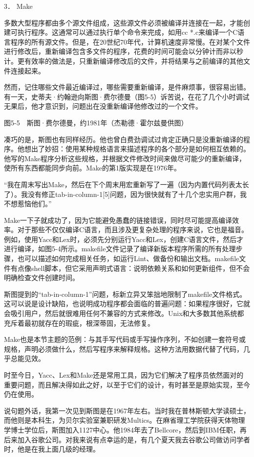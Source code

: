 \documentclass[a4paper,12pt,UTF8,twoside]{ctexbook}
\begin{document}
{{3． Make


多数大型程序都由多个源文件组成，这些源文件必须被编译并连接在一起，才能创建可执行程序。这通常可以通过执行单个命令来完成，如用cc *.c来编译一个C语言程序的所有源文件。但是，在20世纪70年代，计算机速度非常慢。在对某个文件进行修改后，重新编译包含多文件的程序，花费的时间可能会以分钟计而非以秒计。更有效率的做法是，只重新编译修改后的文件，并将结果与之前编译的其他文件连接起来。

然而，记住哪些文件最近编译过，哪些需要重新编译，是件麻烦事，很容易出错。有一天，史蒂夫·约翰逊向斯图·费尔德曼（图5-5）诉苦说，在花了几个小时调试无果后，他才意识到，问题出在没重新编译他修改过的一个文件。



图5-5　斯图·费尔德曼，约1981年（杰勒德·霍尔兹曼供图）

凑巧的是，斯图也有同样经历。他也曾白费劲调试过肯定正确只是没重新编译的程序。他想出了妙招：使用某种规格语言来描述程序的各个部分是如何相互依赖的。他写的Make程序分析这些规格，并根据文件修改时间来做尽可能少的重新编译，使所有东西都能同步向前。Make的第1版实现是在1976年。

“我在周末写出Make，然后在下个周末用宏重新写了一遍（因为内置代码列表太长了）。我没有修正tab-in-column-1[5]问题，因为很快就有了十几个忠实用户群，我不想惹恼他们。”



Make一下子就成功了，因为它能避免愚蠢的链接错误，同时尽可能提高编译效率。对于那些不仅仅编译C语言，而且涉及更复杂处理的程序来说，它也是福音。例如，使用Yacc和Lex时，必须先分别运行Yacc和Lex，创建C语言文件，然后才进行编译，如图5-4所示。makefile文件记录了编译新版本程序所需的所有处理步骤，也可以描述如何完成相关任务，如运行Lint、做备份和输出文档。makefile文件有点像shell脚本，但它采用声明式语言：说明依赖关系和如何更新组件，但不会明确检查文件创建时间。

斯图提到的“tab-in-column-1”问题，标新立异又笨拙地限制了makefile文件格式。这可以说是设计缺陷，也说明成功程序都会面临的普遍问题：如果程序很好，它就会吸引用户，然后就很难用任何不兼容的方式来修改。Unix和大多数其他系统都充斥着最初就存在的瑕疵，根深蒂固，无法修复。

Make也是本节主题的范例：与其手写代码或手写操作序列，不如创建一套符号或规格，声明必须做什么，然后写程序来解释规格。这种方法用数据代替了代码，几乎总能见效。

时至今日，Yacc、Lex和Make还是常用工具，因为它们解决了程序员依然面对的重要问题，而且解决得如此之好，以至于它们的设计，有时甚至是原始实现，至今仍在使用。

说句题外话，我第一次见到斯图是在1967年左右。当时我在普林斯顿大学读硕士，而他则是本科生，为贝尔实验室兼职研发Multics。在麻省理工学院获得天体物理学博士学位后，斯图加入1127中心。他1984年去了Bellcore，然后到IBM任职，再后来加入谷歌公司。对我来说有点幸运的是，有几个夏天我去谷歌公司做访问学者时，他是在我上面几级的经理。





}}
\end{document}
